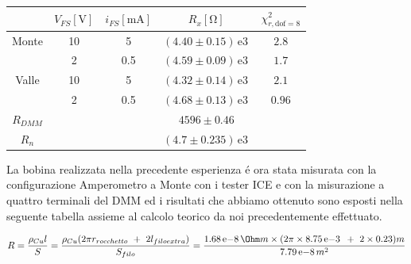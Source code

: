\documentclass{article}
\newcommand{\E}[1]{\, \mathrm{e}{#1} \, }
\begin{document}
\begin{center}
\begin{tabular}{c|c|c|c|c}
	& $V_{FS} [\si{\volt}]$ & $i_{FS} [\si{\milli\ampere}]$ & $R_x [\si{\ohm}]$ & $\chi ^2_{r,\mathrm{dof}=8}$ \\
	\hline
	Monte 
	& 10 & 5 & $(4.40 \pm 0.15)\E{3}$ & $2.8$ \\
	& 2 & 0.5 & $(4.59 \pm 0.09)\E{3}$ & $1.7$ \\
	Valle 
	& 10 & 5 & $(4.32 \pm 0.14)\E{3}$ & $2.1$ \\
	& 2 & 0.5 & $(4.68 \pm 0.13)\E{3}$ & $0.96$ \\
	$R_{DMM}$ &  &  & $4596 \pm 0.46$ &  \\
	$R_n$ &  &  & $(4.7 \pm 0.235) \E{3}$ & 
\end{tabular}
\end{center}


La bobina realizzata nella precedente esperienza \'e ora stata misurata con la configurazione Amperometro a Monte con i tester ICE e con la misurazione a quattro terminali del DMM ed i risultati che abbiamo ottenuto sono esposti nella seguente tabella assieme al calcolo teorico da noi precedentemente effettuato.

\begin{equation}
    R = \frac{\rho_{Cu} l}{S} = \frac{\rho_{Cu} (2 \pi r_{rocchetto} \ + \ 2 l_{filo extra})}{S_{filo}} = \frac{1.68\E{-8}\Ohm m \times (2 \pi \times 8.75\E{-3} \ + \ 2 \times 0.23)m}{7.79\E{-8}m^2}
\end{equation}
\end{document}
